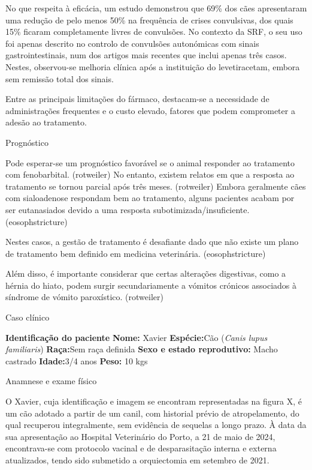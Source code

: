 No que respeita à eficácia, um estudo demonstrou que 69\% dos cães apresentaram uma redução de pelo menos 50\% na frequência de crises convulsivas, dos quais 15\% ficaram completamente livres de convulsões.\cite{Packer2015} No contexto da SRF, o seu uso foi apenas descrito no controlo de convulsões autonómicas com sinais gastrointestinais, num dos artigos mais recentes que inclui apenas três casos. Nestes, observou-se melhoria clínica após a instituição do levetiracetam, embora sem remissão total dos sinais.\cite{Diop2025}


Entre as principais limitações do fármaco, destacam-se a necessidade de administrações frequentes e o custo elevado, \cite{ajvr} fatores que podem comprometer a adesão ao tratamento.

Prognóstico


Pode esperar-se um prognóstico favorável se o animal responder ao tratamento com fenobarbital. (rotweiler) No entanto, existem relatos em que a resposta ao tratamento se tornou parcial após três meses. (rotweiler) Embora geralmente cães com sialoadenose respondam bem ao tratamento, alguns pacientes acabam por ser eutanasiados devido a uma resposta subotimizada/insuficiente. (eosophstricture) 

Nestes casos, a gestão de tratamento é desafiante dado que não existe um plano de tratamento bem definido em medicina veterinária. (eosophstricture)


Além disso, é importante considerar que certas alterações digestivas, como a hérnia do hiato, podem surgir secundariamente a vómitos crónicos associados à síndrome de vómito paroxístico. (rotweiler)


Caso clínico


\textbf{Identificação do paciente}
\textbf{Nome:} Xavier
\textbf{Espécie:}Cão (\textit{Canis lupus familiaris})
\textbf{Raça:}Sem raça definida
\textbf{Sexo e estado reprodutivo:} Macho castrado
\textbf{Idade:}3/4 anos
\textbf{Peso:} 10 kgs

Anamnese e exame físico

O Xavier, cuja identificação e imagem se encontram representadas na figura X, é um cão adotado a partir de um canil, com historial prévio de atropelamento, do qual recuperou integralmente, sem evidência de sequelas a longo prazo. À data da sua apresentação ao Hospital Veterinário do Porto, a 21 de maio de 2024, encontrava-se com protocolo vacinal e de desparasitação interna e externa atualizados, tendo sido submetido a orquiectomia em setembro de 2021. 


